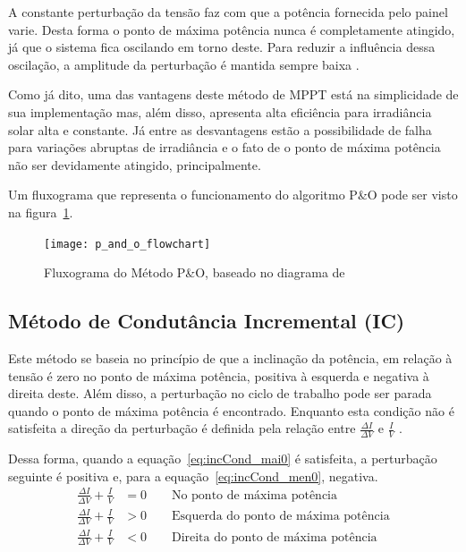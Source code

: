 \documentclass[
	12pt,				%
	openany,
	onseside,
	a4paper,			%
	english,			%
	french,				%
	spanish,			%
	brazil,				%
	]{abntex2}
\begin{document}
A constante perturbação da tensão faz com que a potência fornecida pelo painel varie. Desta forma o ponto de máxima potência nunca é completamente atingido, já que o sistema fica oscilando em torno deste. Para reduzir a influência dessa oscilação, a amplitude da perturbação é mantida sempre baixa \cite{MPPT_P&O_IC}.

Como já dito, uma das vantagens deste método de MPPT está na simplicidade de sua implementação mas, além disso, apresenta alta eficiência para irradiância solar alta e constante. Já entre as desvantagens estão a possibilidade de falha para variações abruptas de irradiância e o fato de o ponto de máxima potência não ser devidamente atingido, principalmente\cite{MPPT_P&O_IC}.

Um fluxograma que representa o funcionamento do algoritmo P\&O pode ser visto na figura~\ref{fig:PeO_Flux}.

\begin{figure}[htbp]
	\begin{center}
		\texttt{[image: p\_and\_o\_flowchart]}
		\caption{Fluxograma do Método P\&O, baseado no diagrama de }
		\label{fig:PeO_Flux}
	\end{center}
\end{figure}

\subsection{Método de Condutância Incremental (IC)}

Este método se baseia no princípio de que a inclinação da potência, em relação à tensão é zero no ponto de máxima potência, positiva à esquerda e negativa à direita deste. Além disso, a perturbação no ciclo de trabalho pode ser parada quando o ponto de máxima potência é encontrado. Enquanto esta condição não é satisfeita a direção da perturbação é definida pela relação entre $\frac{\Delta I}{\Delta V}$ e $\frac{I}{V}$ \cite{Talha_MPPT}\cite{MPPT_P&O_IC}.

Dessa forma, quando a equação~\ref{eq:incCond_mai0} é satisfeita, a perturbação seguinte é positiva e, para a equação~\ref{eq:incCond_men0}, negativa.
\begin{align}%
	\frac{\Delta I}{\Delta V} + \frac{I}{V} &= 0 \qquad \text{No ponto de máxima potência} \label{eq:incCond_at_mpp}\\
	\frac{\Delta I}{\Delta V} + \frac{I}{V} &> 0 \qquad \text{Esquerda do ponto de máxima potência} \label{eq:incCond_mai0}\\
	\frac{\Delta I}{\Delta V} + \frac{I}{V} &< 0 \qquad \text{Direita do ponto de máxima potência} \label{eq:incCond_men0}
\end{align}
\end{document}
